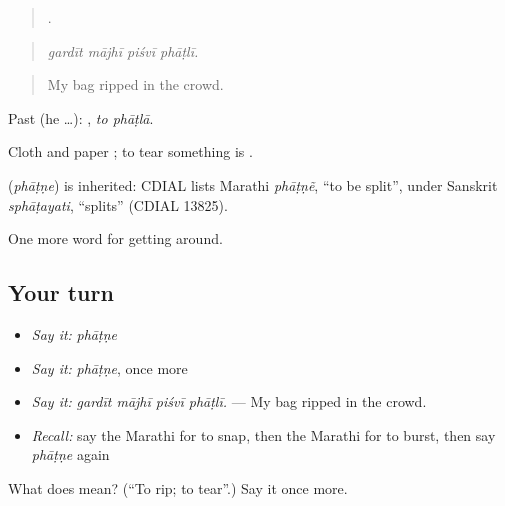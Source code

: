 \begin{quote}
   .
\end{quote}

\begin{quote}
\emph{gardīt mājhī piśvī phāṭlī.}
\end{quote}

\begin{quote}
My bag ripped in the crowd.
\end{quote}

Past (he …):  , \emph{to phāṭlā}.

Cloth and paper ; to tear something is .

\begin{cousinweb}
\textbf{} (\emph{phāṭṇe}) is inherited: CDIAL lists Marathi \emph{phāṭṇẽ}, \textquotedblleft{}to be split\textquotedblright{}, under Sanskrit \emph{sphāṭayati}, \textquotedblleft{}splits\textquotedblright{} (CDIAL 13825).
\end{cousinweb}

\begin{grammarlens}[title={What you've built}]
One more word for getting around.
\end{grammarlens}

\subsection*{Your turn}
\begin{itemize}
\raggedright
  \item \emph{Say it:} \emph{phāṭṇe}
  \item \emph{Say it:} \emph{phāṭṇe}, once more
  \item \emph{Say it:} \emph{gardīt mājhī piśvī phāṭlī.} — My bag ripped in the crowd.
  \item \emph{Recall:} say the Marathi for to snap, then the Marathi for to burst, then say \emph{phāṭṇe} again
\end{itemize}

\begin{tcolorbox}[breakable,colback=teal!4,colframe=teal!35!black,title={Before you move on}]
What does  mean? (\textquotedblleft{}To rip; to tear\textquotedblright{}.) Say it once more.
\end{tcolorbox}
